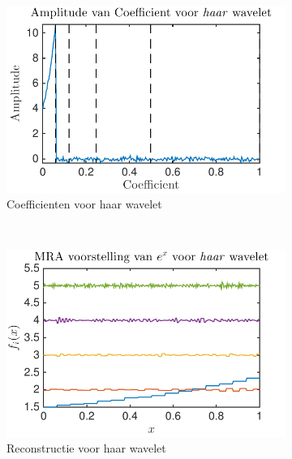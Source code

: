 \begin{figure}
    \centering
     \begin{subfigure}[b]{0.4\textwidth}
            \includegraphics[width=\textwidth]{../src/denoising/haar_Noise/coef_exp_haar_4_noise_10}
            \caption{Coefficienten voor haar wavelet}
            \label{fig:tiger}
        \end{subfigure}
        ~ %
        \begin{subfigure}[b]{0.4\textwidth}
            \includegraphics[width=\textwidth]{../src/denoising/haar_Noise/MRA_exp_haar_4_noise_10}
            \caption{Reconstructie voor haar wavelet}
            \label{fig:mouse}
        \end{subfigure}
    \begin{subfigure}[b]{0.4\textwidth}

\end{subfigure}
\end{figure}
